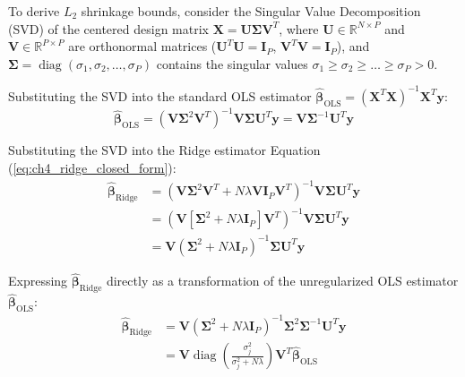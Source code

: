 To derive $L_2$ shrinkage bounds, consider the Singular Value Decomposition (SVD) of the centered design matrix $\mathbf{X} = \mathbf{U} \mathbf{\Sigma} \mathbf{V}^T$, where $\mathbf{U} \in \mathbb{R}^{N \times P}$ and $\mathbf{V} \in \mathbb{R}^{P \times P}$ are orthonormal matrices ($\mathbf{U}^T \mathbf{U} = \mathbf{I}_P$, $\mathbf{V}^T \mathbf{V} = \mathbf{I}_P$), and $\mathbf{\Sigma} = \operatorname{diag}(\sigma_1, \sigma_2, \dots, \sigma_P)$ contains the singular values $\sigma_1 \ge \sigma_2 \ge \dots \ge \sigma_P > 0$.

Substituting the SVD into the standard OLS estimator $\hat{\boldsymbol{\beta}}_{\text{OLS}} = (\mathbf{X}^T \mathbf{X})^{-1} \mathbf{X}^T \mathbf{y}$:
\begin{equation}
\hat{\boldsymbol{\beta}}_{\text{OLS}} = \left( \mathbf{V} \mathbf{\Sigma}^2 \mathbf{V}^T \right)^{-1} \mathbf{V} \mathbf{\Sigma} \mathbf{U}^T \mathbf{y} = \mathbf{V} \mathbf{\Sigma}^{-1} \mathbf{U}^T \mathbf{y}
\end{equation}

Substituting the SVD into the Ridge estimator Equation (\ref{eq:ch4_ridge_closed_form}):
\begin{align}
\hat{\boldsymbol{\beta}}_{\text{Ridge}} &= \left( \mathbf{V} \mathbf{\Sigma}^2 \mathbf{V}^T + N \lambda \mathbf{V} \mathbf{I}_P \mathbf{V}^T \right)^{-1} \mathbf{V} \mathbf{\Sigma} \mathbf{U}^T \mathbf{y} \\
&= \left( \mathbf{V} [ \mathbf{\Sigma}^2 + N \lambda \mathbf{I}_P ] \mathbf{V}^T \right)^{-1} \mathbf{V} \mathbf{\Sigma} \mathbf{U}^T \mathbf{y} \\
&= \mathbf{V} \left( \mathbf{\Sigma}^2 + N \lambda \mathbf{I}_P \right)^{-1} \mathbf{\Sigma} \mathbf{U}^T \mathbf{y}
\label{eq:ch4_ridge_svd}
\end{align}

Expressing $\hat{\boldsymbol{\beta}}_{\text{Ridge}}$ directly as a transformation of the unregularized OLS estimator $\hat{\boldsymbol{\beta}}_{\text{OLS}}$:
\begin{align}
\hat{\boldsymbol{\beta}}_{\text{Ridge}} &= \mathbf{V} \left( \mathbf{\Sigma}^2 + N \lambda \mathbf{I}_P \right)^{-1} \mathbf{\Sigma}^2 \mathbf{\Sigma}^{-1} \mathbf{U}^T \mathbf{y} \\
&= \mathbf{V} \operatorname{diag}\left( \frac{\sigma_j^2}{\sigma_j^2 + N \lambda} \right) \mathbf{V}^T \hat{\boldsymbol{\beta}}_{\text{OLS}}
\label{eq:ch4_ridge_shrinkage_matrix}
\end{align}

